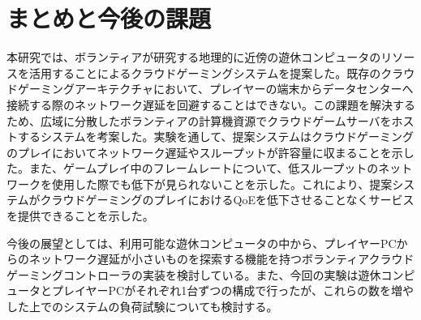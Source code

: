 \section{まとめと今後の課題}
本研究では、ボランティアが研究する地理的に近傍の遊休コンピュータのリソースを活用することによるクラウドゲーミングシステムを提案した。既存のクラウドゲーミングアーキテクチャにおいて、プレイヤーの端末からデータセンターへ接続する際のネットワーク遅延を回避することはできない。この課題を解決するため、広域に分散したボランティアの計算機資源でクラウドゲームサーバをホストするシステムを考案した。実験を通して、提案システムはクラウドゲーミングのプレイにおいてネットワーク遅延やスループットが許容量に収まることを示した。また、ゲームプレイ中のフレームレートについて、低スループットのネットワークを使用した際でも低下が見られないことを示した。これにより、提案システムがクラウドゲーミングのプレイにおけるQoEを低下させることなくサービスを提供できることを示した。

今後の展望としては、利用可能な遊休コンピュータの中から、プレイヤーPCからのネットワーク遅延が小さいものを探索する機能を持つボランティアクラウドゲーミングコントローラの実装を検討している。また、今回の実験は遊休コンピュータとプレイヤーPCがそれぞれ1台ずつの構成で行ったが、これらの数を増やした上でのシステムの負荷試験についても検討する。

